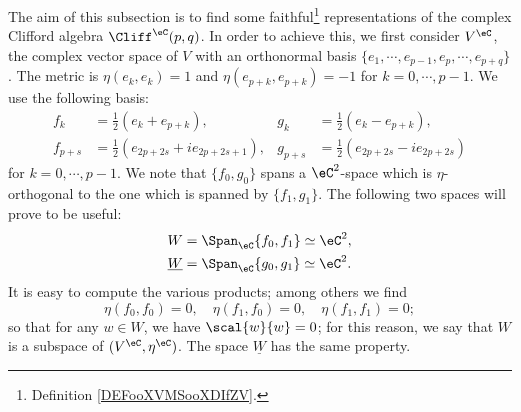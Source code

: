 The aim of this subsection is to find some faithful\footnote{Definition \ref{DEFooXVMSooXDIfZV}.} representations of the complex Clifford algebra $\Cliff^{\eC}(p,q)$. In order to achieve this, we first consider $V^{\eC}$, the complex vector space of $V$ with an orthonormal basis $\{ e_1,\cdots,e_{p-1},e_p,\cdots,e_{p+q} \}$. The metric is $\eta(e_k,e_k)=1$ and $\eta(e_{p+k},e_{p+k})=-1$ for $k=0,\cdots,p-1$. We use the following basis:
\begin{align}		\label{SUBEQooZLYUooUfZQFL}
	f_k     & =\frac{1}{2}(e_k+e_{p+k}),            & g_k     & =\frac{1}{2}(e_k-e_{p+k}),         \\
	f_{p+s} & =\frac{1}{2}(e_{2p+2s}+ie_{2p+2s+1}), & g_{p+s} & =\frac{1}{2}(e_{2p+2s}-ie_{2p+2s})
\end{align}
for $k=0,\cdots,p-1$.
We note that $\{f_0,g_0\}$ spans a $\eC^2$-space which is $\eta$-orthogonal to the one which is spanned by $\{f_1,g_1\}$. The following two  spaces will prove to be useful:
\begin{subequations}		\label{SUBEQSooHDHKooMWSPxg}
	\begin{align}
		W             & =\Span_{\eC}\{f_0,f_1\}\simeq\eC^2, \\
		\underline{W} & =\Span_{\eC}\{g_0,g_1\}\simeq\eC^2.
	\end{align}
\end{subequations}
It is easy to compute the various products; among others we find
\begin{equation}
	\eta(f_0,f_0)=0,\quad
	\eta(f_1,f_0)=0,\quad
	\eta(f_1,f_1)=0;
\end{equation}
so that for any $w\in W$, we have $\scal{w}{w}=0$; for this reason, we say that $W$ is a  subspace of $(V^{\eC},\eta^{\eC})$. The space $\underline{W}$ has the same property.

